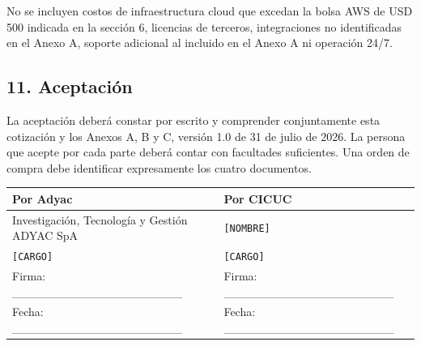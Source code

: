 \documentclass[
]{article}
\begin{document}
No se incluyen costos de infraestructura cloud que excedan la bolsa AWS
de USD 500 indicada en la sección 6, licencias de terceros,
integraciones no identificadas en el Anexo A, soporte adicional al
incluido en el Anexo A ni operación 24/7.

\hypertarget{11-aceptaciuxf3n}{%
\subsection{11. Aceptación}\label{11-aceptaciuxf3n}}

La aceptación deberá constar por escrito y comprender conjuntamente esta
cotización y los Anexos A, B y C, versión 1.0 de 31 de julio de 2026. La
persona que acepte por cada parte deberá contar con facultades
suficientes. Una orden de compra debe identificar expresamente los
cuatro documentos.

\begin{longtable}[]{@{}ll@{}}
\toprule\noalign{}
Por Adyac & Por CICUC \\
\midrule\noalign{}
\endhead
\bottomrule\noalign{}
\endlastfoot
Investigación, Tecnología y Gestión ADYAC SpA & \texttt{{[}NOMBRE{]}} \\
\texttt{{[}CARGO{]}} & \texttt{{[}CARGO{]}} \\
Firma: \_\_\_\_\_\_\_\_\_\_\_\_\_\_\_\_\_\_\_\_ & Firma:
\_\_\_\_\_\_\_\_\_\_\_\_\_\_\_\_\_\_\_\_ \\
Fecha: \_\_\_\_\_\_\_\_\_\_\_\_\_\_\_\_\_\_\_\_ & Fecha:
\_\_\_\_\_\_\_\_\_\_\_\_\_\_\_\_\_\_\_\_ \\
\end{longtable}
\end{document}
